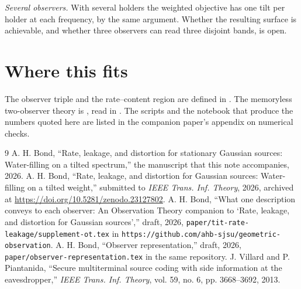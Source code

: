 \documentclass[11pt]{article}
\begin{document}
\emph{Several observers.} With several holders the weighted objective
has one tilt per holder at each frequency, by the same argument. Whether
the resulting surface is achievable, and whether three observers can
read three disjoint bands, is open.

\section*{Where this fits}

The observer triple and the rate--content region are defined in
\cite{obsrep}. The memoryless two-observer theory is \cite{paper1}, read
in \cite{supp1}. The scripts and the notebook that produce the numbers
quoted here are listed in the companion paper's appendix on numerical
checks.

\begin{thebibliography}{9}
 A. H. Bond, ``Rate, leakage, and distortion for
stationary Gaussian sources: Water-filling on a tilted spectrum,''
the manuscript that this note accompanies, 2026.
 A. H. Bond, ``Rate, leakage, and distortion for Gaussian
sources: Water-filling on a tilted weight,'' submitted to \emph{IEEE
Trans. Inf. Theory}, 2026, archived at
\url{https://doi.org/10.5281/zenodo.23127802}.
 A. H. Bond, ``What one description conveys to each
observer: An Observation Theory companion to `Rate, leakage, and
distortion for Gaussian sources','' draft, 2026,
\texttt{paper/tit-rate-leakage/supplement-ot.tex} in
\texttt{https://github.com/ahb-sjsu/geometric-observation}.
 A. H. Bond, ``Observer representation,'' draft, 2026,
\texttt{paper/observer-representation.tex} in the same repository.
 J. Villard and P. Piantanida, ``Secure multiterminal
source coding with side information at the eavesdropper,'' \emph{IEEE
Trans. Inf. Theory}, vol. 59, no. 6, pp. 3668--3692, 2013.
\end{thebibliography}
\end{document}

